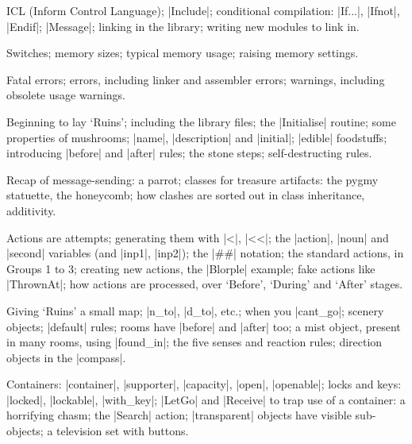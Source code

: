 
%
ICL (Inform Control Language); |Include|; conditional compilation: |If...|,
|Ifnot|, |Endif|; |Message|; linking in the library; writing new modules
to link in.

%
Switches; memory sizes; typical memory usage; raising memory settings.

%
Fatal errors; errors, including linker and assembler errors; warnings,
including obsolete usage warnings.

\bigskip
{}


%
Beginning to lay `Ruins'; including the library files; the |Initialise|
routine; some properties of mushrooms; |name|, |description| and |initial|;
|edible| foodstuffs; introducing |before| and |after| rules; the stone
steps; self-destructing rules.

%
Recap of message-sending: a parrot; classes for treasure artifacts:
the pygmy statuette, the honeycomb; how clashes are sorted out in class
inheritance, additivity.

%
Actions are attempts; generating them with |<|, |<<|; the |action|,
|noun| and |second| variables (and |inp1|, |inp2|); the |##| notation;
the standard actions, in Groups 1 to 3; creating new actions, the
|Blorple| example; fake actions like |ThrownAt|; how actions are processed,
over `Before', `During' and `After' stages.


%
Giving `Ruins' a small map; |n_to|, |d_to|, etc.; when you |cant_go|;
scenery objects; |default| rules; rooms have |before| and |after| too; a
mist object, present in many rooms, using |found_in|; the five senses
and reaction rules; direction objects in the |compass|.

%
Containers: |container|, |supporter|, |capacity|, |open|, |openable|; locks
and keys: |locked|, |lockable|, |with_key|; |LetGo| and |Receive| to trap
use of a container: a horrifying chasm; the |Search| action; |transparent|
objects have visible sub-objects; a television set with buttons.

